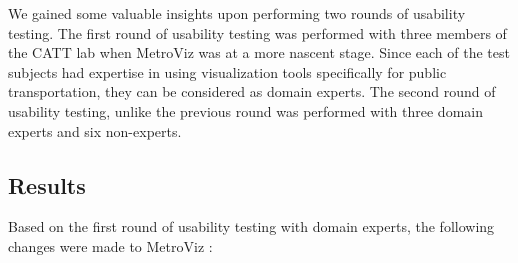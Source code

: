 \documentclass[journal]{vgtc}
\begin{document}
We gained some valuable insights upon performing two rounds of usability testing. The first round of usability testing was performed with three members of the CATT lab when MetroViz was at a more nascent stage. Since each of the test subjects had expertise in using visualization tools specifically for public transportation, they can be considered as domain experts. The second round of usability testing, unlike the previous round was performed with three domain experts and six non-experts.


\subsection{Results}

Based on the first round of usability testing with domain experts, the following changes were made to MetroViz :
\end{document}
